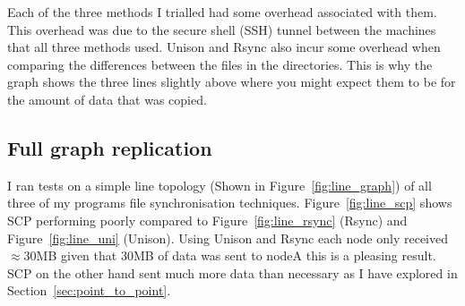 \documentclass[12pt]{article}
\begin{document}
Each of the three methods I trialled had some overhead associated
with them. This overhead was due to the secure shell (SSH) tunnel between
the machines that all three methods used. Unison and Rsync also
incur some overhead when comparing the differences between the files
in the directories. This is why the graph shows the three lines
slightly above where you might expect them to be for the amount
of data that was copied.

\subsection{Full graph replication}
\label{sec:full_graph_rep}
I ran tests on a simple line topology (Shown in
Figure~\ref{fig:line_graph}) of all three of my
programs file synchronisation techniques.
Figure~\ref{fig:line_scp} shows SCP performing
poorly compared to Figure~\ref{fig:line_rsync} (Rsync)
and Figure~\ref{fig:line_uni} (Unison). Using Unison and
Rsync each node only received $\approx$30MB given that
30MB of data was sent to nodeA this is a pleasing
result. SCP on the other hand sent much more data
than necessary as I have explored in 
Section~\ref{sec:point_to_point}. 
\end{document}
